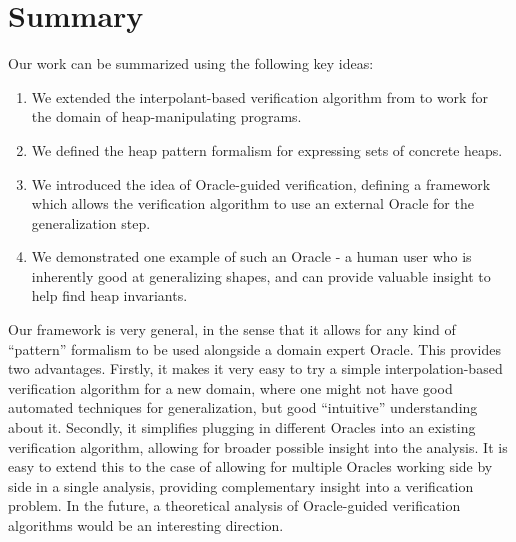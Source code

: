 \section{Summary}
Our work can be summarized using the following key ideas:

\begin{enumerate}
  \item We extended the interpolant-based verification algorithm from \cite{mcmillan06} to work for the domain of heap-manipulating programs.
  \item We defined the heap pattern formalism for expressing sets of concrete heaps.
  \item We introduced the idea of Oracle-guided verification, defining a framework which allows the verification algorithm to use an external Oracle for the generalization step.
  \item We demonstrated one example of such an Oracle - a human user who is inherently good at generalizing shapes, and can provide valuable insight to help find heap invariants.
\end{enumerate}

Our framework is very general, in the sense that it allows for any kind of ``pattern'' formalism to be used alongside a domain expert Oracle. This provides two advantages. Firstly, it makes it very easy to try a simple interpolation-based verification algorithm for a new domain, where one might not have good automated techniques for generalization, but good ``intuitive'' understanding about it. Secondly, it simplifies plugging in different Oracles into an existing verification algorithm, allowing for broader possible insight into the analysis. It is easy to extend this to the case of allowing for multiple Oracles working side by side in a single analysis, providing complementary insight into a verification problem. In the future, a theoretical analysis of Oracle-guided verification algorithms would be an interesting direction.
